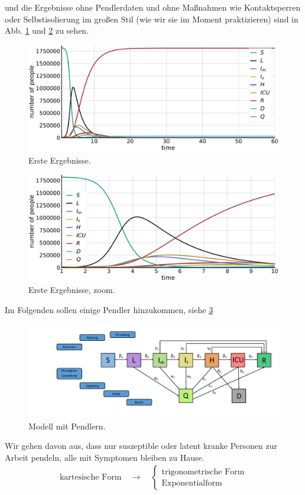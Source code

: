 \documentclass[twoside]{article}
\begin{document}
und die Ergebnisse ohne Pendlerdaten und ohne Ma\ss nahmen wie Kontaktsperren oder Selbstisolierung im gro\ss en Stil (wie wir sie im Moment praktizieren) sind in Abb. \ref{fig:ersteErgebnisse} und \ref{fig:ersteErgebnisseZoom} zu sehen. 
%
\begin{figure}[h!]
	\centering
	\includegraphics[width=\textwidth]{./hamburgSIR}
	\caption{Erste Ergebnisse.}
	\label{fig:ersteErgebnisse}
\end{figure}
%
\begin{figure}
	\centering
	\includegraphics[width=\textwidth]{./hamburgSIRzoom}
	\caption{Erste Ergebnisse, zoom.}
	\label{fig:ersteErgebnisseZoom}	
\end{figure}


Im Folgenden sollen einige Pendler hinzukommen, siehe \ref{fig:modellPendler}
\begin{figure}[h!]
	\centering
	\includegraphics[width=\textwidth]{./flowchart_mit_Pendlern.pdf}
	\caption{Modell mit Pendlern.}
	\label{fig:modellPendler}
\end{figure}
%
Wir gehen davon aus, dass nur suszeptible oder latent kranke Personen zur Arbeit pendeln, alle mit Symptomen bleiben zu Hause.
\newpage
\begin{align*}
\text{kartesische Form}\quad\rightarrow\quad\begin{cases}\text{trigonometrische Form}\\
\text{Exponentialform}
\end{cases}
\end{align*}
\end{document}
